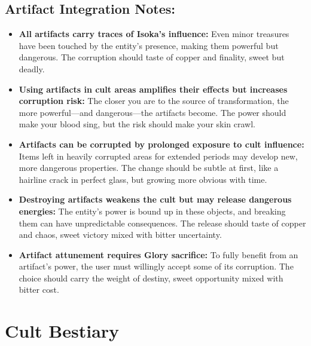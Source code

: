 \documentclass[11pt]{article}
\begin{document}
\subsection{Artifact Integration Notes:}
\begin{itemize}
\item \textbf{All artifacts carry traces of Isoka's influence:} Even minor treasures have been touched by the entity's presence, making them powerful but dangerous. The corruption should taste of copper and finality, sweet but deadly.
\item \textbf{Using artifacts in cult areas amplifies their effects but increases corruption risk:} The closer you are to the source of transformation, the more powerful—and dangerous—the artifacts become. The power should make your blood sing, but the risk should make your skin crawl.
\item \textbf{Artifacts can be corrupted by prolonged exposure to cult influence:} Items left in heavily corrupted areas for extended periods may develop new, more dangerous properties. The change should be subtle at first, like a hairline crack in perfect glass, but growing more obvious with time.
\item \textbf{Destroying artifacts weakens the cult but may release dangerous energies:} The entity's power is bound up in these objects, and breaking them can have unpredictable consequences. The release should taste of copper and chaos, sweet victory mixed with bitter uncertainty.
\item \textbf{Artifact attunement requires Glory sacrifice:} To fully benefit from an artifact's power, the user must willingly accept some of its corruption. The choice should carry the weight of destiny, sweet opportunity mixed with bitter cost.
\end{itemize}

\section{Cult Bestiary}
\end{document}
